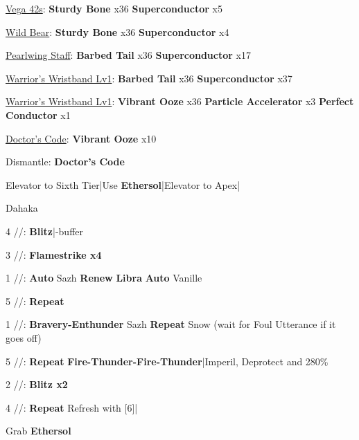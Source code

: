 \begin{upgrade}
	\item \underline{Vega 42s}: \textbf{Sturdy Bone} x36 \to \textbf{Superconductor} x5
	\item \underline{Wild Bear}: \textbf{Sturdy Bone} x36 \to \textbf{Superconductor} x4
	\item \underline{Pearlwing Staff}: \textbf{Barbed Tail} x36 \to \textbf{Superconductor} x17
	\item \underline{Warrior's Wristband Lv1}: \textbf{Barbed Tail} x36 \to \textbf{Superconductor} x37
	\item \underline{Warrior's Wristband Lv1}: \textbf{Vibrant Ooze} x36 \to \textbf{Particle Accelerator} x3 \to \textbf{Perfect Conductor} x1
	\item \underline{Doctor's Code}: \textbf{Vibrant Ooze} x10
	\item Dismantle: \textbf{Doctor's Code}
\end{upgrade}
\begin{mainlist}
	\item Elevator to Sixth Tier|Use \textbf{Ethersol}|Elevator to Apex|
\end{mainlist}
\begin{fight}{Dahaka}
	\item [4] \com/\com/\rav: \textbf{Blitz}|\rav-buffer
	\item [3] \rav/\sen/\rav: \textbf{Flamestrike x4}
	\item [1] \syn/\sen/\rav: \textbf{Auto} Sazh \to \textbf{Renew} \to \textbf{Libra} \to \textbf{Auto} Vanille
	\item [5] \rav/\sen/\sab: \textbf{Repeat}
	\item [1] \syn/\sen/\rav: \textbf{Bravery-Enthunder} Sazh \to \textbf{Repeat} Snow (wait for Foul Utterance if it goes off)
	\item [5] \rav/\sen/\sab: \textbf{Repeat} \to \textbf{Fire-Thunder-Fire-Thunder}|Imperil, Deprotect and 280\%
	\item [2] \com/\rav/\rav: \textbf{Blitz x2}
	\item [4] \com/\com/\rav: \textbf{Repeat} \to Refresh with [6]|
\end{fight}
\begin{mainlist}
	\item Grab \textbf{Ethersol}
\end{mainlist}
